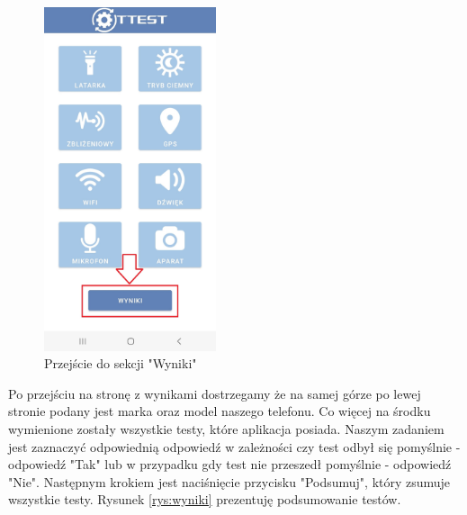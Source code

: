 \begin{figure}[!hbt]
	\begin{center}
		\includegraphics[angle=360, width=0.45\textwidth]{rys/punkt6/menu8}
		\caption{Przejście do sekcji "Wyniki"}
		\label{rys:menu8}
	\end{center}
\end{figure}

\newpage


Po przejściu na stronę z wynikami dostrzegamy że na samej górze po lewej stronie podany jest marka oraz model naszego telefonu. Co więcej na środku wymienione zostały wszystkie testy, które aplikacja posiada. Naszym zadaniem jest zaznaczyć odpowiednią odpowiedź w zależności czy test odbył się pomyślnie - odpowiedź "Tak" lub w przypadku gdy test nie przeszedł pomyślnie - odpowiedź "Nie". Następnym krokiem jest naciśnięcie przycisku "Podsumuj", który zsumuje wszystkie testy. Rysunek \ref{rys:wyniki} prezentuję podsumowanie testów.

